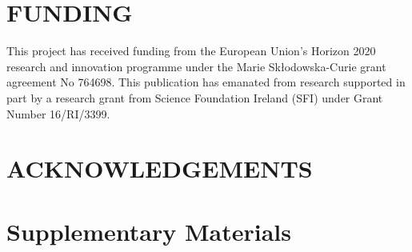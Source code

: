 \documentclass[11pt, a4paper]{article}
\begin{document}
\nolinenumbers
\section*{FUNDING}
This project has received funding from the European Union's Horizon 2020 research and innovation programme under the Marie Skłodowska-Curie grant agreement No 764698. This publication has emanated from research supported in part by a research grant from Science Foundation Ireland (SFI) under Grant Number 16/RI/3399.

\nolinenumbers
\section*{ACKNOWLEDGEMENTS}

\nolinenumbers


\nolinenumbers
\singlespacing
\newrefcontext[sorting=ydnt]
\printbibliography

\clearpage
\setcounter{figure}{0}
\setcounter{table}{0}
\setcounter{page}{1}
\renewcommand{\thepage}{S\arabic{page}}
\renewcommand{\thesection}{S\arabic{section}}
\renewcommand{\thetable}{S\arabic{table}}
\renewcommand{\thefigure}{S\arabic{figure}}
\section*{Supplementary Materials}
\label{sec:supplementary}
\end{document}
